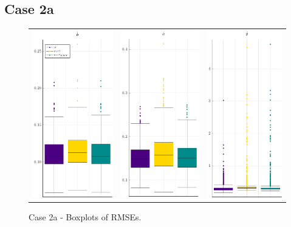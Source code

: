 \subsection{Case 2a}
\begin{figure}[ht]
\centering
	 \begin{tabular}[b]{c c c}
		\includegraphics[width=.3\textwidth]{Figures/2a/RMSE_b.pdf} & \includegraphics[width=.3\textwidth]{Figures/2a/RMSE_a.pdf} & \includegraphics[width=.3\textwidth]{Figures/2a/RMSE_t.pdf}
	\end{tabular}
\caption{Case 2a - Boxplots of RMSEs.}
	\label{fig:bpRMSE2a}
\end{figure}
